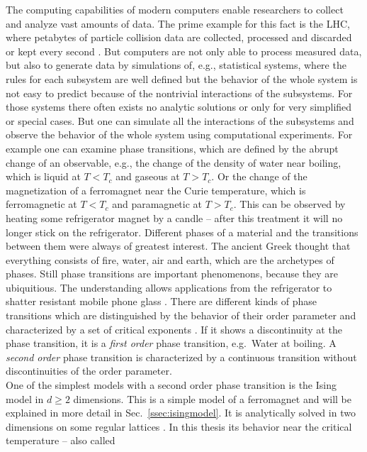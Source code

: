 The computing capabilities of modern computers enable researchers to
collect and analyze vast amounts of data. The prime example for this fact
is the LHC, where petabytes of particle collision data are collected,
processed and discarded or kept every second \cite{LHC}.
But computers are not only able to process measured data, but
also to generate data by simulations of, e.g., statistical systems, where
the rules for each subsystem are well defined but the behavior of the
whole system is not easy to predict because of the nontrivial interactions of the
subsystems. For those systems there often exists no analytic solutions
or only for very simplified or special cases. But one can simulate all
the interactions of the subsystems and observe the behavior of the whole
system using computational experiments.
For example one can examine phase transitions, which are defined by the abrupt
change of an observable, e.g., the change of the density of water near
boiling, which is liquid at \(T < T_c\) and gaseous at \(T > T_c\). Or
the change of the magnetization of a ferromagnet near the Curie temperature,
which is ferromagnetic at \(T < T_c\) and paramagnetic at \(T > T_c\).
This can be observed by heating some refrigerator magnet by a candle --
after this treatment it will no longer stick on the refrigerator.
Different phases of a material and the transitions between them were
always of greatest interest. The ancient Greek thought that everything
consists of fire, water, air and earth, which are the archetypes of
phases. Still phase transitions are important phenomenons, because they
are ubiquitious. The understanding allows applications from the
refrigerator to shatter resistant mobile phone glass \cite{PJournalGlass}.
There are different kinds of phase transitions which are distinguished by
the behavior of their order parameter and characterized by a set of
critical exponents \cite{yeomans}. If it shows a discontinuity at
the phase transition, it is a \emph{first order} phase transition, e.g.\ Water at boiling.
A \emph{second order} phase transition is characterized by a continuous
transition without discontinuities of the order parameter.\\
One of the simplest models with a second order phase transition is the
Ising model \cite{Ising1925} in \(d \ge 2\) dimensions. This is a simple
model of a ferromagnet and will be explained in more detail in Sec.\
\ref{ssec:isingmodel}. It is analytically solved in two dimensions on
some regular lattices \cite{Onsager1944} \cite{Wannier1945}.
In this thesis its behavior near the critical temperature -- also called

